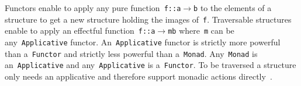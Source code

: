 \documentclass[9pt,preprint,authoryear]{sigplanconf}
\begin{document}
%
Functors enable to apply any pure function{~}\textcolor[rgb]{0,0,0.80}{\texttt{f}}\textcolor[rgb]{0,0,0.80}{\texttt{\mbox{\hspace{0.50em}}}}\textcolor[cmyk]{0,0.65,0.99,0}{\texttt{{:}{:}}}\textcolor[rgb]{0,0,0.80}{\texttt{\mbox{\hspace{0.50em}}}}\textcolor[rgb]{0,0,0.80}{\texttt{a}}\textcolor[rgb]{0,0,0.80}{\texttt{\mbox{\hspace{0.50em}}}}\textcolor[cmyk]{0,0.65,0.99,0}{\texttt{$ \rightarrow $}}\textcolor[rgb]{0,0,0.80}{\texttt{\mbox{\hspace{0.50em}}}}\textcolor[rgb]{0,0,0.80}{\texttt{b}} to the
    elements of a structure to get a new structure holding the images
    of{~}\textcolor[rgb]{0,0,0.80}{\texttt{f}}. Traversable structures enable to apply an effectful
    function{~}\textcolor[rgb]{0,0,0.80}{\texttt{f}}\textcolor[rgb]{0,0,0.80}{\texttt{\mbox{\hspace{0.50em}}}}\textcolor[cmyk]{0,0.65,0.99,0}{\texttt{{:}{:}}}\textcolor[rgb]{0,0,0.80}{\texttt{\mbox{\hspace{0.50em}}}}\textcolor[rgb]{0,0,0.80}{\texttt{a}}\textcolor[rgb]{0,0,0.80}{\texttt{\mbox{\hspace{0.50em}}}}\textcolor[cmyk]{0,0.65,0.99,0}{\texttt{$ \rightarrow $}}\textcolor[rgb]{0,0,0.80}{\texttt{\mbox{\hspace{0.50em}}}}\textcolor[rgb]{0,0,0.80}{\texttt{m}}\textcolor[rgb]{0,0,0.80}{\texttt{\mbox{\hspace{0.50em}}}}\textcolor[rgb]{0,0,0.80}{\texttt{b}} where{~}\textcolor[rgb]{0,0,0.80}{\texttt{m}} can be any{~}\textcolor[rgb]{0,0,0.80}{\texttt{Applicative}}    functor. An{~}\textcolor[rgb]{0,0,0.80}{\texttt{Applicative}} functor is strictly more powerful
    than a{~}\textcolor[rgb]{0,0,0.80}{\texttt{Functor}} and strictly less powerful than a{~}\textcolor[rgb]{0,0,0.80}{\texttt{Monad}}.
    Any{~}\textcolor[rgb]{0,0,0.80}{\texttt{Monad}} is an{~}\textcolor[rgb]{0,0,0.80}{\texttt{Applicative}} and any{~}\textcolor[rgb]{0,0,0.80}{\texttt{Applicative}}    is a{~}\textcolor[rgb]{0,0,0.80}{\texttt{Functor}}. To be traversed a structure only needs
    an applicative and therefore support monadic actions
    directly{~}\cite{mcbride_applicative_2007}.%


{\nopagebreak }
\end{document}

